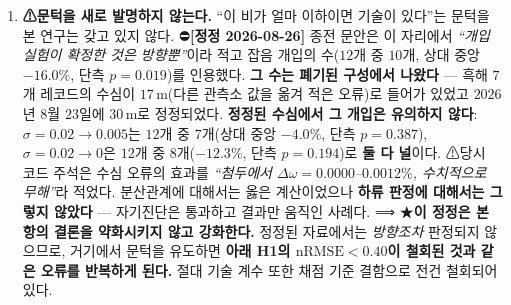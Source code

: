 \documentclass[11pt]{report}
\numberwithin{equation}{chapter}
\numberwithin{figure}{chapter}
\numberwithin{table}{chapter}
\begin{document}
\begin{enumerate}
  \item \textbf{⚠문턱을 새로 발명하지 않는다.} ``이 비가 얼마 이하이면 기술이 있다''는
        문턱을 본 연구는 갖고 있지 않다.
        ⛔\textbf{[정정 2026-08-26]} 종전 문안은 이 자리에서 \emph{``개입 실험이 확정한 것은
        방향뿐''}이라 적고 잡음 개입의 수($12$개 중 $10$개, 상대 중앙 $-16.0\%$,
        단측 $p = 0.019$)를 인용했다. \textbf{그 수는 폐기된 구성에서 나왔다} ---
        흑해 $7$개 레코드의 수심이 $17$\,m(다른 관측소 값을 옮겨 적은 오류)로 들어가 있었고
        $2026$년 $8$월 $23$일에 $30$\,m로 정정되었다.
        \textbf{정정된 수심에서 그 개입은 유의하지 않다}: $\sigma = 0.02 \to 0.005$는
        $12$개 중 $7$개(상대 중앙 $-4.0\%$, 단측 $p = 0.387$), $\sigma = 0.02 \to 0$은
        $12$개 중 $8$개($-12.3\%$, 단측 $p = 0.194$)로 \textbf{둘 다 널}이다.
        ⚠당시 코드 주석은 수심 오류의 효과를 \emph{``첨두에서 $\Delta\omega = 0.0000$--$0.0012\%$,
        수치적으로 무해''}라 적었다. 분산관계에 대해서는 옳은 계산이었으나
        \textbf{하류 판정에 대해서는 그렇지 않았다} --- 자기진단은 통과하고 결과만 움직인 사례다.
        ⟹ ★\textbf{이 정정은 본 항의 결론을 약화시키지 않고 강화한다.}
        정정된 자료에서는 \emph{방향조차} 판정되지 않으므로, 거기에서 문턱을 유도하면
        \textbf{아래 H1의 $\text{nRMSE} < 0.40$이 철회된 것과 같은 오류를 반복하게 된다.}
        절대 기술 계수 또한 채점 기준 결함으로 전건 철회되어 있다.
\end{enumerate}
\end{document}
